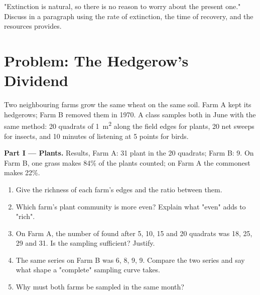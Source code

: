 \begin{exercise}[$\star\star\star$]\label{exo:g10:biodiversity-scales:15}
"Extinction is natural, so there is no reason to worry about the
present one." Discuss in a paragraph using the rate of extinction, the
time of recovery, and the resources  provides.
\end{exercise}

\section{Problem: The Hedgerow's Dividend}

\begin{problem}
\label{pb:g10:biodiversity-scales:1}
Two neighbouring farms grow the same wheat on the same soil. Farm A
kept its hedgerows; Farm B removed them in 1970. A class samples both
in June with the same method: 20 quadrats of \qty{1}{m^2} along the
field edges for plants, 20 net sweeps for insects, and 10 minutes of
listening at 5 points for birds.

\medskip
\noindent\textbf{Part I --- Plants.}
Results, Farm A: 31 plant  in the 20 quadrats; Farm B: 9.
On Farm B, one grass makes 84\% of the plants counted; on Farm A the
commonest  makes 22\%.
\begin{enumerate}
  \item Give the  richness of each farm's edges and the ratio
        between them.
  \item Which farm's plant community is more even? Explain what
        "even" adds to "rich".
  \item On Farm A, the number of  found after 5, 10, 15 and 20
        quadrats was 18, 25, 29 and 31. Is the sampling sufficient?
        Justify.
  \item The same series on Farm B was 6, 8, 9, 9. Compare the two
        series and say what shape a "complete" sampling curve takes.
  \item Why must both farms be sampled in the same month?
\end{enumerate}


\end{problem}
